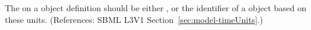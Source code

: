 The  on a \Model object definition should be either
,  or the identifier of a
\UnitDefinition object based on these units.  (References: SBML L3V1
Section~\ref{sec:model-timeUnits}.)

